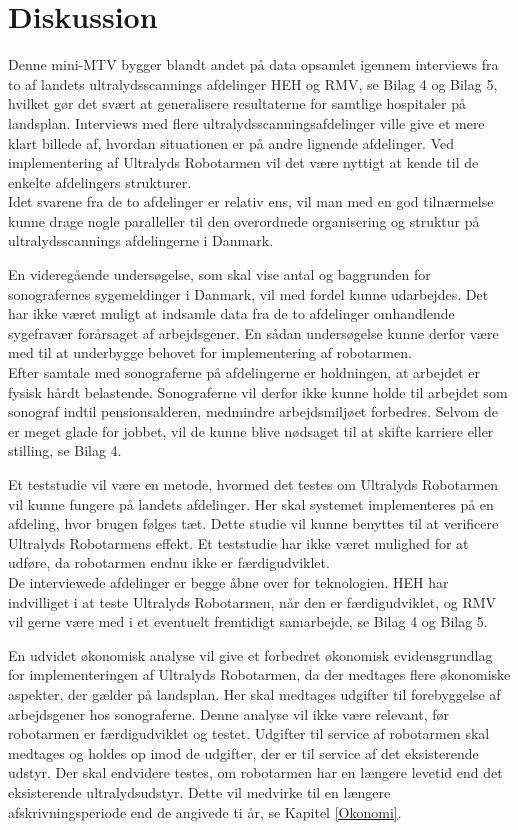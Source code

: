\chapter{Diskussion}
Denne mini-MTV bygger blandt andet på data opsamlet igennem interviews fra to af landets ultralydsscannings afdelinger HEH og RMV, se Bilag 4 og Bilag 5, hvilket gør det svært at generalisere resultaterne for samtlige hospitaler på landsplan. Interviews med flere ultralydsscanningsafdelinger ville give et mere klart billede af, hvordan situationen er på andre lignende afdelinger. Ved implementering af Ultralyds Robotarmen vil det være nyttigt at kende til de enkelte afdelingers strukturer. \\
Idet svarene fra de to afdelinger er relativ ens, vil man med en god tilnærmelse kunne drage nogle paralleller til den overordnede organisering og struktur på ultralydsscannings afdelingerne i Danmark.

En videregående undersøgelse, som skal vise antal og baggrunden for sonografernes sygemeldinger i Danmark, vil med fordel kunne udarbejdes. Det har ikke været muligt at indsamle data fra de to afdelinger omhandlende sygefravær forårsaget af arbejdsgener. En sådan undersøgelse kunne derfor være med til at underbygge behovet for implementering af robotarmen. \\
Efter samtale med sonograferne på afdelingerne er holdningen, at arbejdet er fysisk hårdt belastende.  Sonograferne vil derfor ikke kunne holde til arbejdet som sonograf indtil pensionsalderen, medmindre arbejdsmiljøet forbedres. Selvom de er meget glade for jobbet, vil de kunne blive nødsaget til at skifte karriere eller stilling, se Bilag 4. 

Et teststudie vil være en metode, hvormed det testes om Ultralyds Robotarmen vil kunne fungere på landets afdelinger. Her skal systemet implementeres på en afdeling, hvor brugen følges tæt. Dette studie vil kunne benyttes til at verificere Ultralyds Robotarmens effekt. Et teststudie har ikke været mulighed for at udføre, da robotarmen endnu ikke er færdigudviklet. \\
De interviewede afdelinger er begge åbne over for teknologien. HEH har indvilliget i at teste Ultralyds Robotarmen, når den er færdigudviklet, og RMV vil gerne være med i et eventuelt fremtidigt samarbejde, se Bilag 4 og Bilag 5. 

En udvidet økonomisk analyse vil give et forbedret økonomisk evidensgrundlag for implementeringen af Ultralyds Robotarmen, da der medtages flere økonomiske aspekter, der gælder på landsplan. Her skal medtages udgifter til forebyggelse af arbejdsgener hos sonograferne. Denne analyse vil ikke være relevant, før robotarmen er færdigudviklet og testet. Udgifter til service af robotarmen skal medtages og holdes op imod de udgifter, der er til service af det eksisterende udstyr. Der skal endvidere testes, om robotarmen har en længere levetid end det eksisterende ultralydsudstyr. Dette vil medvirke til en længere afskrivningsperiode end de angivede ti år, se Kapitel \ref{Okonomi}. 

